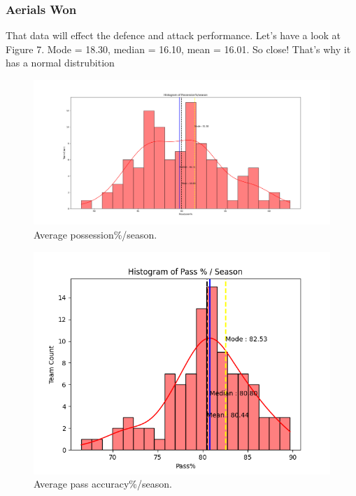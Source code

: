 \documentclass[conference]{IEEEtran}
\begin{document}
\subsubsection{Aerials Won}
That data will effect the defence and attack performance. Let's have a look at Figure 7. Mode  = 18.30, median = 16.10, mean = 16.01. So close! That's why it has a normal distrubition

\begin{figure}[h]
  \includegraphics[width=\linewidth]{Possession.png}
  \caption{Average possession\%/season.}
  \label{fig:possession}
\end{figure}

\begin{figure}[h]
  \includegraphics[width=\linewidth]{Pass.png}
  \caption{Average pass accuracy\%/season.}
  \label{fig:pass}
\end{figure}
\end{document}
